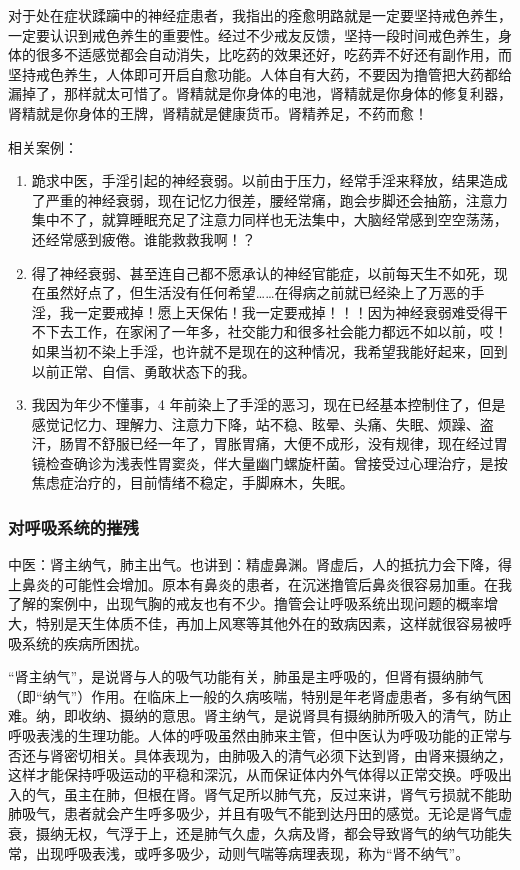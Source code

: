 \documentclass[fontset=founder]{ctexart}
\begin{document}
对于处在症状蹂躏中的神经症患者，我指出的痊愈明路就是一定要坚持戒色养生，一定要认识到戒色养生的重要性。经过不少戒友反馈，坚持一段时间戒色养生，身体的很多不适感觉都会自动消失，比吃药的效果还好，吃药弄不好还有副作用，而坚持戒色养生，人体即可开启自愈功能。人体自有大药，不要因为撸管把大药都给漏掉了，那样就太可惜了。肾精就是你身体的电池，肾精就是你身体的修复利器，肾精就是你身体的王牌，肾精就是健康货币。肾精养足，不药而愈！

相关案例：

\begin{enumerate}
    \item 跪求中医，手淫引起的神经衰弱。以前由于压力，经常手淫来释放，结果造成了严重的神经衰弱，现在记忆力很差，腰经常痛，跑会步脚还会抽筋，注意力集中不了，就算睡眠充足了注意力同样也无法集中，大脑经常感到空空荡荡，还经常感到疲倦。谁能救救我啊！？
    \item 得了神经衰弱、甚至连自己都不愿承认的神经官能症，以前每天生不如死，现在虽然好点了，但生活没有任何希望……在得病之前就已经染上了万恶的手淫，我一定要戒掉！愿上天保佑！我一定要戒掉！！！因为神经衰弱难受得干不下去工作，在家闲了一年多，社交能力和很多社会能力都远不如以前，哎！如果当初不染上手淫，也许就不是现在的这种情况，我希望我能好起来，回到以前正常、自信、勇敢状态下的我。
    \item 我因为年少不懂事，4 年前染上了手淫的恶习，现在已经基本控制住了，但是感觉记忆力、理解力、注意力下降，站不稳、眩晕、头痛、失眠、烦躁、盗汗，肠胃不舒服已经一年了，胃胀胃痛，大便不成形，没有规律，现在经过胃镜检查确诊为浅表性胃窦炎，伴大量幽门螺旋杆菌。曾接受过心理治疗，是按焦虑症治疗的，目前情绪不稳定，手脚麻木，失眠。
\end{enumerate}

\subsubsection{对呼吸系统的摧残}

中医：肾主纳气，肺主出气。也讲到：精虚鼻渊。肾虚后，人的抵抗力会下降，得上鼻炎的可能性会增加。原本有鼻炎的患者，在沉迷撸管后鼻炎很容易加重。在我了解的案例中，出现气胸的戒友也有不少。撸管会让呼吸系统出现问题的概率增大，特别是天生体质不佳，再加上风寒等其他外在的致病因素，这样就很容易被呼吸系统的疾病所困扰。

“肾主纳气”，是说肾与人的吸气功能有关，肺虽是主呼吸的，但肾有摄纳肺气（即“纳气”）作用。在临床上一般的久病咳喘，特别是年老肾虚患者，多有纳气困难。纳，即收纳、摄纳的意思。肾主纳气，是说肾具有摄纳肺所吸入的清气，防止呼吸表浅的生理功能。人体的呼吸虽然由肺来主管，但中医认为呼吸功能的正常与否还与肾密切相关。具体表现为，由肺吸入的清气必须下达到肾，由肾来摄纳之，这样才能保持呼吸运动的平稳和深沉，从而保证体内外气体得以正常交换。呼吸出入的气，虽主在肺，但根在肾。肾气足所以肺气充，反过来讲，肾气亏损就不能助肺吸气，患者就会产生呼多吸少，并且有吸气不能到达丹田的感觉。无论是肾气虚衰，摄纳无权，气浮于上，还是肺气久虚，久病及肾，都会导致肾气的纳气功能失常，出现呼吸表浅，或呼多吸少，动则气喘等病理表现，称为“肾不纳气”。
\end{document}
